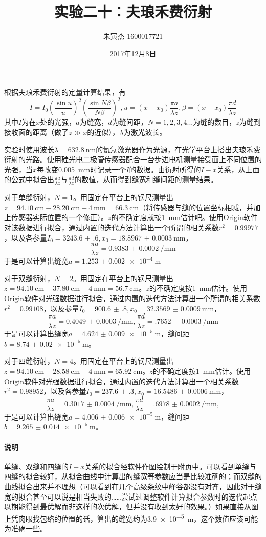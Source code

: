 \documentclass[UTF8]{ctexart}
\title{实验二十：夫琅禾费衍射}
\author{朱寅杰 1600017721}
\date{2017年12月8日}
\begin{document}
\maketitle
根据夫琅禾费衍射的定量计算结果，有
\[
I=I_0(\frac{\sin u}{u})^2(\frac{\sin{N\beta}}{N\beta})^2,u=(x-x_0)\frac{\pi a}{\lambda z},\beta=(x-x_0)\frac{\pi d}{\lambda z}
\]
其中$I$为在$x$处的光强，$a$为缝宽，$d$为缝间距，$N=1,2,3,4...$为缝的数目，$z$为缝到接收面的距离（做了$z\gg x$的近似），$\lambda$为激光波长。

实验时使用波长$\lambda=\SI{632.8}{\nm}$的氦氖激光器作为光源，在光学平台上搭出夫琅禾费衍射的光路。使用硅光电二极管传感器配合一台步进电机测量接受面上不同位置的光强，当$x$每改变\SI{0.005}{\mm}时记录一个$I$的数据。由衍射所得的$I-x$关系，从上面的公式中拟合出$\frac{\pi a}{\lambda z}$与$\frac{\pi d}{\lambda z}$的数值，从而得到缝宽和缝间距的测量结果。

对于单缝衍射，$N=1$。用固定在平台上的钢尺测量出$z=\SI{94.10}{\cm}-\SI{28.20}{\cm}+\SI{4}{\mm}=\SI{66.3}{\cm}$（将传感器与缝的位置坐标相减，并加上传感器实际位置的一个修正）。$z$的不确定度就按\SI{1}{\mm}估计吧。使用Origin软件对该数据进行拟合，通过内置的迭代方法计算出一个所谓的相关系数$r^2=0.99977$，以及各参量$I_0=\num{3243.6(6)},x_0=\SI{18.8967(3)}{\mm}$，
\[\frac{\pi a}{\lambda z}=\SI{0.9383(2)}{\per\mm}\]
于是可以计算出缝宽$a=\SI{1.253(2)e-4}{\m}$

对于双缝衍射，$N=2$。用固定在平台上的钢尺测量出$z=\SI{94.10}{\cm}-\SI{37.80}{\cm}+\SI{4}{\mm}=\SI{56.7}{\cm}$。$z$的不确定度按\SI{1}{\mm}估计。使用Origin软件对光强数据进行拟合，通过内置的迭代方法计算出一个所谓的相关系数$r^2=0.99108$，以及参量$I_0=\num{900.6(8)},x_0=\SI{32.3569(9)}{\mm}$，
\[\frac{\pi a}{\lambda z}=\SI{0.4049(3)}{\per\mm},\frac{\pi d}{\lambda z}=\SI{.7652(3)}{\per\mm}\]
于是可以计算出缝宽$a=\SI{4.624(9)e-5}{\m}$，缝间距$b=\SI{8.74(2)e-5}{\m}$。

对于四缝衍射，$N=4$。用固定在平台上的钢尺测量出$z=\SI{94.10}{\cm}-\SI{28.58}{\cm}+\SI{4}{\mm}=\SI{65.92}{\cm}$。$z$的不确定度按\SI{1}{\mm}估计。使用Origin软件对光强数据进行拟合，通过内置的迭代方法计算出一个相关系数$r^2=0.98952$，以及各参量$I_0=\num{237.6(3)},x_0=\SI{16.5486(6)}{\mm}$，
\[\frac{\pi a}{\lambda z}=\SI{0.3017(4)}{\per\mm},\frac{\pi d}{\lambda z}=\SI{.6978(2)}{\per\mm},\]
于是可以计算出缝宽$a=\SI{4.006(6)e-5}{\m}$，缝间距$b=\SI{9.265(14)e-5}{\m}$。
\paragraph{说明}
单缝、双缝和四缝的$I-x$关系的拟合经软件作图绘制于附页中。可以看到单缝与四缝的拟合较好，从拟合曲线中计算出的缝宽等参数应当是比较准确的；而双缝的曲线拟合出来并不理想（可以看到在几个高级条纹中峰谷都没有对齐，因此对于缝宽的拟合甚至可以说是相当失败的……尝试过调整软件计算拟合参数时的迭代起点以期能得到最优解而非这样的次优解，但并没有收到太好的效果。）如果直接从图上凭肉眼找包络的位置的话，算出的缝宽约为\SI{3.9e-5}{\m}，这个数值应该可能为准确一些。
\end{document}

